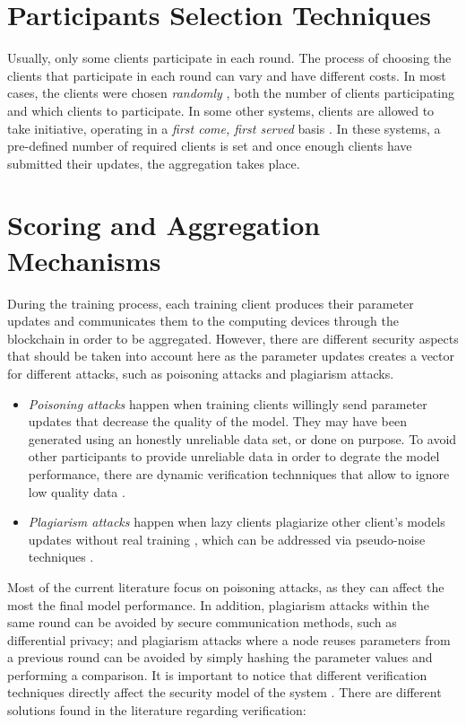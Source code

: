 \section{Participants Selection Techniques}

Usually, only some clients participate in each round. The process of choosing the clients that participate in each round can vary and have different costs. In most cases, the clients were chosen \textit{randomly} \cite{Peyvandi2022}, both the number of clients participating and which clients to participate. In some other systems, clients are allowed to take initiative, operating in a \textit{first come, first served} basis \cite{9184854}. In these systems, a pre-defined number of required clients is set and once enough clients have submitted their updates, the aggregation takes place.

\section{Scoring and Aggregation Mechanisms}

During the training process, each training client produces their parameter updates and communicates them to the computing devices through the blockchain in order to be aggregated. However, there are different security aspects that should be taken into account here as the parameter updates creates a vector for different attacks, such as poisoning attacks and plagiarism attacks.

\begin{itemize}
    \item \textit{Poisoning attacks} happen when training clients willingly send parameter updates that decrease the quality of the model. They may have been generated using an honestly unreliable data set, or done on purpose. To avoid other participants to provide unreliable data in order to degrate the model performance, there are dynamic verification technniques that allow to ignore low quality data \cite{10.48550/arxiv.2110.02182, 10.48550/arxiv.2104.10501}.
    
    \item \textit{Plagiarism attacks} happen when lazy clients plagiarize other client's models updates without real training \cite{9403374}, which can be addressed via pseudo-noise techniques \cite{10.48550/arxiv.2009.09338}.
\end{itemize}

Most of the current literature focus on poisoning attacks, as they can affect the most the final model performance. In addition, plagiarism attacks within the same round can be avoided by secure communication methods, such as differential privacy; and plagiarism attacks where a node reuses parameters from a previous round can be avoided by simply hashing the parameter values and performing a comparison. It is important to notice that different verification techniques directly affect the security model of the system \cite{10.48550/arxiv.2110.02182}. There are different solutions found in the literature regarding verification:

